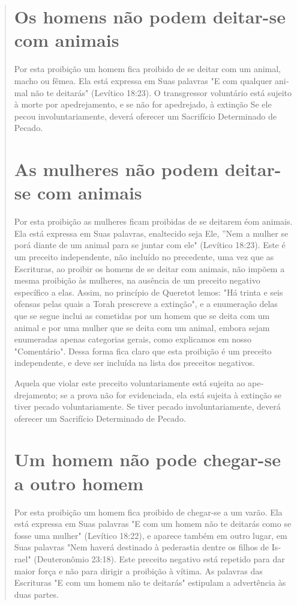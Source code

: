 \begin{quote}

\section{Os homens não podem deitar-se com animais}

Por esta proibição um homem fica proibido de se deitar com um ani­mal,
macho ou fêmea. Ela está expressa em Suas palavras "E com qualquer
ani­mal não te deitarás" (Levítico 18:23). O transgressor voluntário
está sujeito à morte por apedrejamento, e se não for apedrejado, à
extinção Se ele pecou involuntariamente, deverá oferecer um Sacrifício
Determinado de Pecado.

\section{As mulheres não podem deitar-se com animais}

Por esta proibição as mulheres ficam proibidas de se deitarem éom
animais. Ela está expressa em Suas palavras, enaltecido seja Ele, ''Nem
a mulher se porá diante de um animal para se juntar com ele" (Levítico
18:23). Este é um preceito independente, não incluído no precedente, uma
vez que as Escri­turas, ao proibir os homens de se deitar com animais,
não impõem a mesma proibição às mulheres, na ausência de um preceito
negativo específico a elas. Assim, no princípio de Queretot lemos: "Há
trinta e seis ofensas pelas quais a Torah prescreve a extinção", e a
enumeração delas que se segue inclui as co­metidas por um homem que se
deita com um animal e por uma mulher que se deita com um animal, embora
sejam enumeradas apenas categorias gerais, como explicamos em nosso
"Comentário". Dessa forma fica claro que esta proi­bição é um preceito
independente, e deve ser incluída na lista dos preceitos negativos.

Aquela que violar este preceito voluntariamente está sujeita ao
ape­drejamento; se a prova não for evidenciada, ela está sujeita à
extinção se tiver pecado voluntariamente. Se tiver pecado
involuntariamente, deverá oferecer um Sacrifício Determinado de Pecado.

\section{Um homem não pode chegar-se a outro homem}

Por esta proibição um homem fica proibido de chegar-se a um va­rão. Ela
está expressa em Suas palavras "E com um homem não te deitarás co­mo se
fosse uma mulher" (Levítico 18:22), e aparece também em outro lugar, em
Suas palavras "Nem haverá destinado à pederastia dentre os filhos de
Is­rael" (Deuteronômio 23:18). Este preceito negativo está repetido para
dar maior força e não para dirigir a proibição à vítima. As palavras das
Escrituras "E com um homem não te deitarás" estipulam a advertência às
duas partes.


\end{quote}
